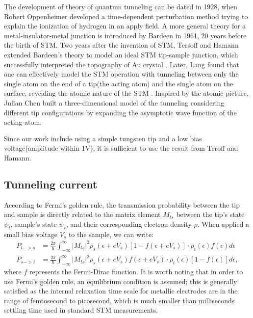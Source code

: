 The development of theory of quantum tunneling can be dated in 1928, when Robert Oppenheimer developed a time-dependent perturbation method trying to explain the ionization of hydrogen in an apply field\cite{oppenheimerThreeNotesQuantum1928}. A more general theory for a metal-insulator-metal junction is introduced by Bardeen in 1961\cite{bardeenTunnellingManyParticlePoint1961}, 20 years before the birth of \ac{STM}. Two years after the invention of \ac{STM}, Tersoff and Hamann extended Bardeen's theory to model an ideal STM tip-sample junction, which successfully interpreted the topography of Au crystal \cite{tersoffTheoryApplicationScanning1983}\cite{tersoffTheoryScanningTunneling1985}. Later, Lang found that one can effectively model the \ac{STM} operation with tunneling between only the single atom on the end of a tip(the acting atom) and the single atom on the surface, revealing the atomic nature of the \ac{STM} \cite{langVacuumTunnelingCurrent1985}\cite{langSpectroscopySingleAtoms1986}\cite{langApparentSizeAtom1987}. Inspired by the atomic picture, Julian Chen built a three-dimensional model of the tunneling considering different tip configurations by expanding the asymptotic wave function of the acting atom\cite{chenTunnelingMatrixElements1990}\cite{chenTheoryScanningTunneling1988}. 

Since our work include using a simple tungsten tip and a low bias voltage(amplitude within 1V), it is sufficient to use the result from Teroff and Hamann.  

\subsection{Tunneling current}
According to Fermi's golden rule, the transmission probability between the tip and sample is directly related to the matrix element $M_{ts}$ between the tip's state $\psi_{t}$, sample's state $\psi_{s}$, and their corresponding electron density $\rho$. When applied a small bias voltage $V_s$ to the sample, we can write:
\begin{align}
	P_{t->s} &= \frac{2\pi}{\hslash}\int_{-\infty}^{\infty}|M_{ts}|^2\rho_s(\epsilon + eV_s)[1-f(\epsilon+eV_s)]\cdot \rho_t(\epsilon)f(\epsilon) d\epsilon \\
	P_{s->t} &= \frac{2\pi}{\hslash}\int_{-\infty}^{\infty}|M_{ts}|^2\rho_s(\epsilon + eV_s)f(\epsilon+eV_s)\cdot \rho_t(\epsilon)[1-f(\epsilon)] d\epsilon,
\end{align} 
where $f$ represents the Fermi-Dirac function. It is worth noting that in order to use Fermi's golden rule, an equilibrium condition is assumed; this is generally satisfied as the internal relaxation time scale for metallic electrodes are in the range of femtosecond to picosecond, which is much smaller than milliseconds settling time used in standard \ac{STM} measurements. 

